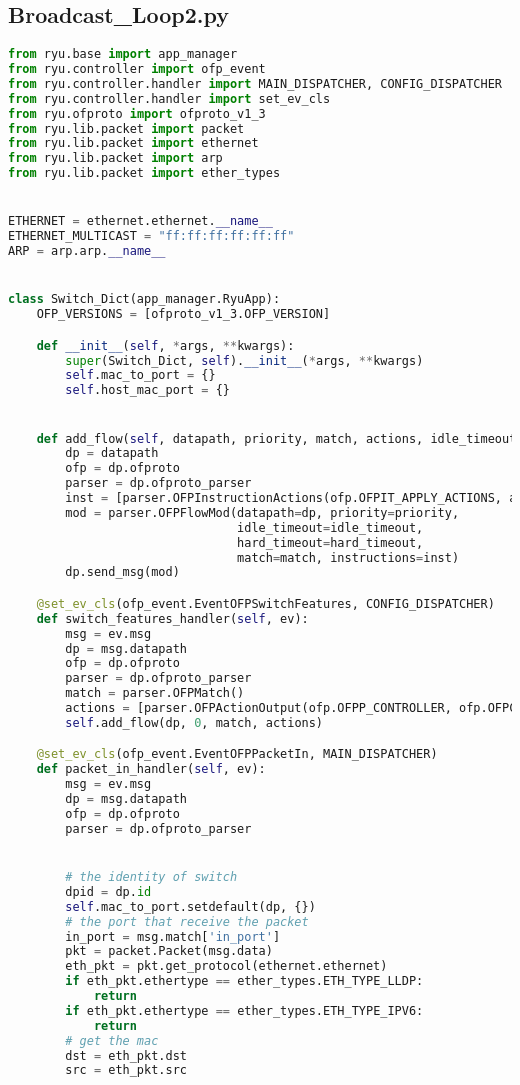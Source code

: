 \documentclass{xjtureport}
\begin{document}
\subsection{Broadcast\_Loop2.py}
\begin{lstlisting}[language=Python]
from ryu.base import app_manager
from ryu.controller import ofp_event
from ryu.controller.handler import MAIN_DISPATCHER, CONFIG_DISPATCHER
from ryu.controller.handler import set_ev_cls
from ryu.ofproto import ofproto_v1_3
from ryu.lib.packet import packet
from ryu.lib.packet import ethernet
from ryu.lib.packet import arp
from ryu.lib.packet import ether_types


ETHERNET = ethernet.ethernet.__name__
ETHERNET_MULTICAST = "ff:ff:ff:ff:ff:ff"
ARP = arp.arp.__name__


class Switch_Dict(app_manager.RyuApp):
	OFP_VERSIONS = [ofproto_v1_3.OFP_VERSION]

	def __init__(self, *args, **kwargs):
		super(Switch_Dict, self).__init__(*args, **kwargs)
		self.mac_to_port = {}
		self.host_mac_port = {}


	def add_flow(self, datapath, priority, match, actions, idle_timeout=0, hard_timeout=0):
		dp = datapath
		ofp = dp.ofproto
		parser = dp.ofproto_parser
		inst = [parser.OFPInstructionActions(ofp.OFPIT_APPLY_ACTIONS, actions)]
		mod = parser.OFPFlowMod(datapath=dp, priority=priority,
								idle_timeout=idle_timeout,
								hard_timeout=hard_timeout,
								match=match, instructions=inst)
		dp.send_msg(mod)

	@set_ev_cls(ofp_event.EventOFPSwitchFeatures, CONFIG_DISPATCHER)
	def switch_features_handler(self, ev):
		msg = ev.msg
		dp = msg.datapath
		ofp = dp.ofproto
		parser = dp.ofproto_parser
		match = parser.OFPMatch()
		actions = [parser.OFPActionOutput(ofp.OFPP_CONTROLLER, ofp.OFPCML_NO_BUFFER)]
		self.add_flow(dp, 0, match, actions)

	@set_ev_cls(ofp_event.EventOFPPacketIn, MAIN_DISPATCHER)
	def packet_in_handler(self, ev):
		msg = ev.msg
		dp = msg.datapath
		ofp = dp.ofproto
		parser = dp.ofproto_parser


		# the identity of switch
		dpid = dp.id
		self.mac_to_port.setdefault(dp, {})
		# the port that receive the packet
		in_port = msg.match['in_port']
		pkt = packet.Packet(msg.data)
		eth_pkt = pkt.get_protocol(ethernet.ethernet)
		if eth_pkt.ethertype == ether_types.ETH_TYPE_LLDP:
			return
		if eth_pkt.ethertype == ether_types.ETH_TYPE_IPV6:
			return
		# get the mac
		dst = eth_pkt.dst
		src = eth_pkt.src


\end{lstlisting}
\end{document}

